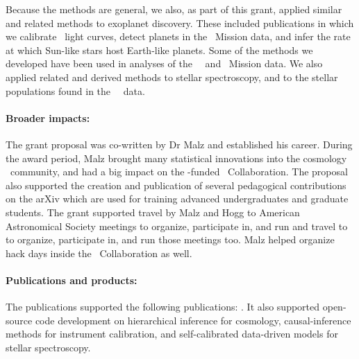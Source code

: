 \documentclass[12pt, fullpage, letterpaper]{article}
\begin{document}
Because the methods are general, we also, as part of this grant,
applied similar and related methods to exoplanet discovery.
These included publications in which we calibrate \Kepler\ light curves,
detect planets in the \Ktwo\ Mission data, and infer the rate at which
Sun-like stars host Earth-like planets.
Some of the methods we developed have been used in analyses of the
\NASA\ \Kepler\ and \TESS\ Mission data.
We also applied related and derived methods to stellar spectroscopy,
and to the stellar populations found in the \ESA\ \Gaia\ data.

\paragraph{Broader impacts:}
The grant proposal was co-written by Dr Malz and established his career.
During the award period, Malz brought many statistical innovations into the
cosmology \LSS\ community, and had a big impact on the \NSF-funded \LSST\ Collaboration.
The proposal also supported the creation and publication of several pedagogical contributions
on the arXiv which are used for training advanced undergraduates and graduate students.
The grant supported travel by Malz and Hogg to American Astronomical Society meetings
to organize, participate in, and run  and travel to
 to organize, participate in, and run those meetings too.
Malz helped organize hack days inside the \LSST\ Collaboration as well.

\paragraph{Publications and products:}
The publications supported the following publications:
\citet{2016arXiv160303040C, 2016arXiv161005873V, 2016ApJ...833..262H,
  2017ApJ...837...20P, 2017ApJ...838....5L, 2017AJ....153..257O,
  2017MNRAS.469.2791H, 2017arXiv171002428W, 2017MNRAS.471..722H,
  2017AJ....154..222L, 2017MNRAS.472.4144V, 2018ApJ...853..198N,
  2018ApJ...857..114W, 2018arXiv180407766H, 2018ApJS..236...11H,
  2018AJ....156...18P, 2018AJ....156...35M, 2018AJ....156..145A,
  2018ApJ...867..101B, 2019MNRAS.482.3696C, 2019ApJ...872..115V,
  2019ApJ...881...80L, 2019arXiv190811523D, 2019AJ....158..171M}.
It also supported open-source code development on hierarchical
inference for cosmology, causal-inference
methods for instrument calibration, and self-calibrated data-driven
models for stellar spectroscopy.
\end{document}
